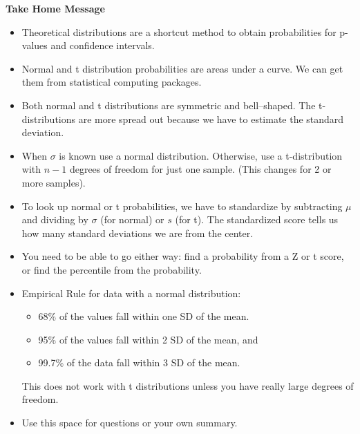 \begin{center}
  {\large\bf Take Home Message}
\end{center}
 
\begin{itemize}
\item Theoretical distributions are a shortcut method to obtain
  probabilities for p-values and confidence intervals.
\item Normal and t distribution probabilities are areas under a
  curve. We can get them from statistical computing packages.
\item Both normal and t distributions are symmetric and
  bell--shaped. The t-distributions are more spread out because we
  have to estimate the standard deviation.
\item When $\sigma$ is known use a normal distribution. Otherwise, use
  a t-distribution with $n-1$ degrees of freedom for just one
  sample. (This changes for 2 or more samples).
\item To look up normal or t probabilities, we have to standardize by
  subtracting $\mu$ and dividing by $\sigma$ (for normal) or $s$ (for
  t). The standardized score tells us how many standard deviations we
  are from the center.
\item You need to be able to go either way: find a probability from a
  Z or t score, or find the percentile from the
  probability.

\item Empirical Rule for data with a normal distribution:
  \begin{itemize}
  \item 68\% of the values fall within one SD of the mean.
  \item 95\% of the values fall within 2 SD of the mean, and 
  \item 99.7\% of the data fall within 3 SD of the mean.
  \end{itemize}
This does not work with t distributions unless you have really large
degrees of freedom.
\item Use this space for questions or your own summary.\vfill
\end{itemize}






